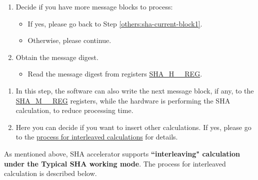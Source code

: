 \documentclass[main\_\_EN.tex]{subfiles}
\begin{document}
\begin{enumerate}
    \item Decide if you have more message blocks to process:
    \begin{itemize}
        \item If yes, please go back to Step \ref{others:sha-current-block1}.
        \item Otherwise, please continue.
    \end{itemize}
    
    \item Obtain the message digest.
    \begin{itemize}
        \item Read the message digest from registers \hyperref[regdesc:SHAHNREG]{SHA\_H\_\_REG}.
    \end{itemize}
\end{enumerate}

\begin{tiplisting}\label{others:sha-note-typical-sha}
\vspace{-2.5em}
\begin{enumerate}
\item In this step, the software can also write the next message block, if any, to the \hyperref[regdesc:SHAMNREG]{SHA\_M\_\_REG} registers, while the hardware is performing the SHA calculation, to reduce processing time.
\item Here you can decide if you want to insert other calculations. If yes, please go to the \hyperref[others:sha-interleaved]{process for interleaved calculations} for details.
\end{enumerate}
\end{tiplisting}

\label{others:sha-interleaved}
As mentioned above, \chipname{} SHA accelerator supports \textbf{``interleaving" calculation under the Typical SHA working mode}. The process for interleaved calculation is described below.
\end{document}
